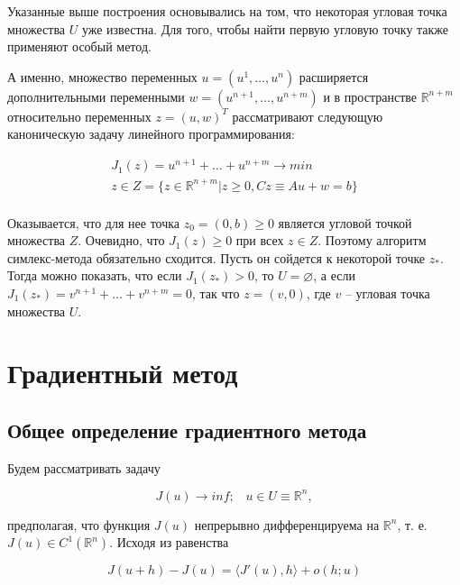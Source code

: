 \documentclass[a4paper, 12pt, titlepage]{article}
\theoremstyle{definition}
\theoremstyle{plain}
\theoremstyle{plain}
\begin{document}
Указанные выше построения основывались на том, что некоторая угловая точка
множества $U$ уже известна. Для того, чтобы найти первую угловую точку также
применяют особый метод.

А именно, множество переменных $u = (u^{1}, \ldots, u^{n})$ расширяется
дополнительными переменными $w = (u^{n + 1}, \ldots, u^{n + m})$ и в
пространстве $\mathbb{R}^{n + m}$ относительно переменных
$z = (u, w)^{T}$ рассматривают следующую каноническую задачу линейного
программирования:

\begin{equation}
\begin{aligned}
 J_{1}(z) = u^{n + 1} + \ldots + u^{n + m} \to min \\
 z \in Z = \{ z \in \mathbb{R}^{n + m} | z \geq 0,
 C z \equiv A u + w = b \} \\
\end{aligned}
\end{equation}

Оказывается, что для нее точка $z_{0} = (0, b) \geq 0$ является угловой точкой
множества $Z$. Очевидно, что $J_{1}(z) \geq 0$ при всех $z \in Z$. Поэтому
алгоритм симлекс-метода обязательно сходится. Пусть он сойдется к некоторой
точке $z_{*}$. Тогда можно показать, что если $J_{1}(z_{*}) > 0$, то
$U = \varnothing$, а если $J_{1}(z_{*}) = v^{n + 1} + \ldots + v^{n + m} = 0$, 
так что $z = (v, 0)$, где $v$ -- угловая точка множества $U$.



\section{Градиентный метод}

\subsection{Общее определение градиентного метода}

Будем рассматривать задачу

\begin{equation}
 J(u) \to inf ; \;\;\; u \in U \equiv \mathbb{R}^{n},
\end{equation}

предполагая, что функция $J(u)$ непрерывно дифференцируема на $\mathbb{R}^{n}$,
т. е. $J(u) \in C^{1}(\mathbb{R}^{n})$. Исходя из равенства

\begin{equation}
 J(u + h) - J(u) = \langle J'(u), h \rangle + o(h; u)
\end{equation}
\end{document}
